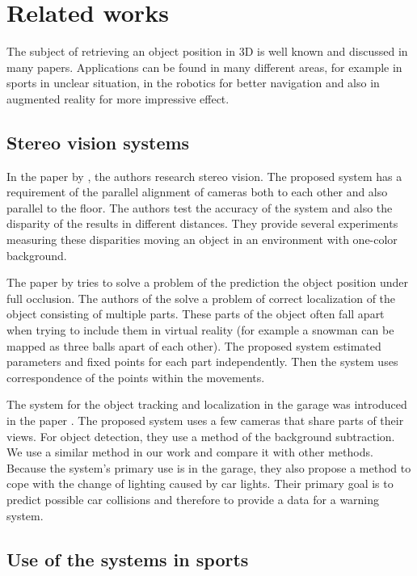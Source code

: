\chapter{Related works} 

The subject of retrieving an object position in 3D is well known and discussed
in many papers. Applications can be found in many different areas, for example in
sports in unclear situation, in the robotics for better navigation and
also in augmented reality for more impressive effect.

\section{Stereo vision systems}

In the paper by \citet*{zheng2010study}, the authors research stereo vision. The
proposed system has a requirement of the parallel alignment of cameras both to
each other and also parallel to the floor. The authors test the accuracy of the
system and also the disparity of the results in different distances. They
provide several experiments measuring these disparities moving an object in an
environment with one-color background.

The paper by \citet*{black2002multi} tries to solve a problem of the prediction
the object position under full occlusion. The authors of the
\citet*{yonemoto1998tracking} solve a problem of correct localization of the
object consisting of multiple parts. These parts of the object often fall apart
when trying to include them in virtual reality (for example a snowman can be
mapped as three balls apart of each other). The proposed system estimated
parameters and fixed points for each part independently. Then the system uses
correspondence of the points within the movements.

The system for the object tracking and localization in the garage was
introduced in the paper \citet*{ibisch2015arbitrary}. The proposed system uses
a few cameras that share parts of their views. For object detection, they use a
method of the background subtraction. We use a similar method in our work and
compare it with other methods. Because the system's primary use is in the
garage, they also propose a method to cope with the change of lighting caused
by car lights. Their primary goal is to predict possible car collisions and
therefore to provide a data for a warning system.

\section{Use of the systems in sports}

